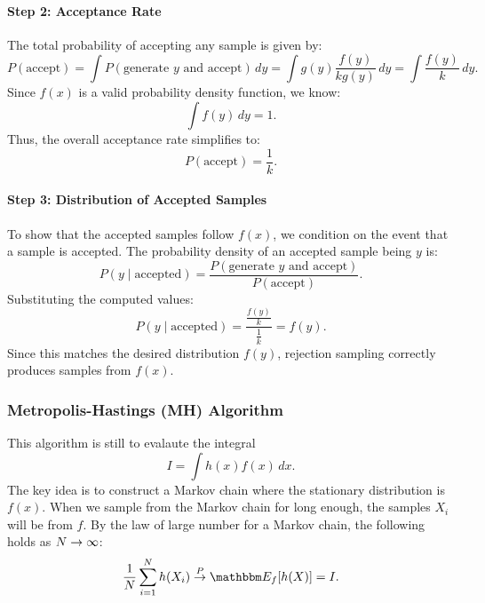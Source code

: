 \paragraph{Step 2: Acceptance Rate}
The total probability of accepting any sample is given by:
\[
P(\text{accept}) = \int P(\text{generate } y \text{ and accept}) \, dy = \int g(y) \frac{f(y)}{k g(y)} \, dy = \int \frac{f(y)}{k} \, dy.
\]
Since \( f(x) \) is a valid probability density function, we know:
\[
\int f(y) \, dy = 1.
\]
Thus, the overall acceptance rate simplifies to:
\[
P(\text{accept}) = \frac{1}{k}.
\]
\paragraph{Step 3: Distribution of Accepted Samples}
To show that the accepted samples follow \( f(x) \), we condition on the event that a sample is accepted. The probability density of an accepted sample being \( y \) is:
\[
P(y \mid \text{accepted}) = \frac{P(\text{generate } y \text{ and accept})}{P(\text{accept})}.
\]
Substituting the computed values:
\[
P(y \mid \text{accepted}) = \frac{\frac{f(y)}{k}}{\frac{1}{k}} = f(y).
\]
Since this matches the desired distribution \( f(y) \), rejection sampling correctly produces samples from \( f(x) \).


    \subsubsection{Metropolis-Hastings (MH) Algorithm}
        This algorithm is still to evalaute the integral
            \begin{equation}
                I = \int h(x) f(x) \, d x.
            \end{equation}
        The key idea is to construct a Markov chain where the stationary distribution is $f(x)$.
        When we sample from the Markov chain for long enough, the samples $X_i$ will be from $f$.
        By the law of large number for a Markov chain, the following holds as $N \rightarrow \infty$: 
            \begin{equation}
                \frac{1}{\ndata}\sum_{i=1}^{\ndata}{h(X_i)} \stackrel{P}{\rightarrow} \E_{f}[h(X)] = I.
            \end{equation}

